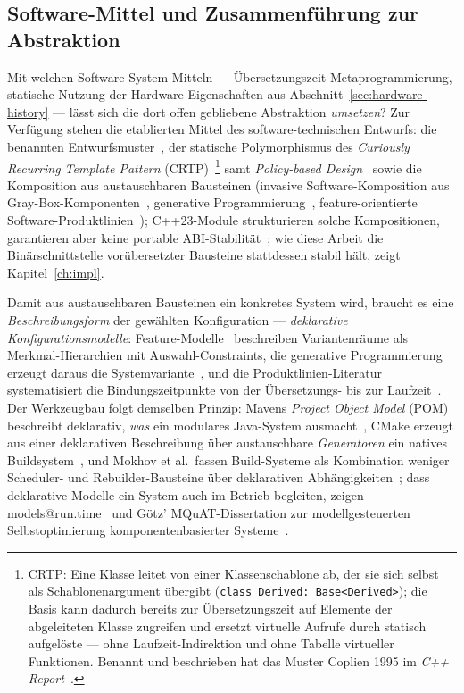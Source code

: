 \begin{nurkurz}
\section{Software-Mittel und Zusammenführung zur Abstraktion}\label{sec:software-means}
Mit welchen Software-System-Mitteln --- Übersetzungszeit-Metaprogrammierung, statische Nutzung der
Hardware-Eigenschaften aus Abschnitt~\ref{sec:hardware-history} --- lässt sich die dort offen gebliebene
Abstraktion \emph{umsetzen}? Zur
Verfügung stehen die etablierten Mittel des software-technischen Entwurfs: die benannten
Entwurfsmuster~\cite{gamma1994patterns}, der statische Polymorphismus des \emph{Curiously Recurring
Template Pattern} (CRTP)~\cite{coplien1995crtp,vandevoorde2017templates}\footnote{CRTP\@: Eine Klasse
leitet von einer Klassenschablone ab, der sie sich selbst als Schablonenargument übergibt
(\texttt{class Derived: Base<Derived>}); die Basis kann dadurch bereits zur Übersetzungszeit auf Elemente der
abgeleiteten Klasse zugreifen und ersetzt virtuelle Aufrufe durch statisch aufgelöste --- ohne
Laufzeit-Indirektion und ohne Tabelle virtueller Funktionen. Benannt und beschrieben hat das Muster
Coplien 1995 im \emph{C++ Report}~\cite{coplien1995crtp}.} samt \emph{Policy-based
Design}~\cite{alexandrescu2001modern} sowie die Komposition aus
austauschbaren Bausteinen (invasive Software-Komposition aus Gray-Box-Komponenten~\cite{assmann2003invasive},
generative Programmierung~\cite{czarnecki2000generative}, feature-orientierte
Software-Produktlinien~\cite{apel2013feature,batory1992hierarchical}); C++23-Module strukturieren solche
Kompositionen, garantieren aber keine portable ABI-Stabilität~\cite{wg21_modules_abi}; wie diese Arbeit die
Binärschnittstelle vorübersetzter Bausteine stattdessen stabil hält, zeigt Kapitel~\ref{ch:impl}.

Damit aus austauschbaren Bausteinen ein konkretes System wird, braucht es eine \emph{Beschreibungsform} der
gewählten Konfiguration --- \emph{deklarative Konfigurationsmodelle}: Feature-Modelle~\cite{kang1990foda}
beschreiben Variantenräume als Merkmal-Hierarchien mit Auswahl-Constraints, die generative Programmierung erzeugt
daraus die Systemvariante~\cite{czarnecki2000generative}, und die Produktlinien-Literatur systematisiert die
Bindungszeitpunkte von der Übersetzungs- bis zur Laufzeit~\cite{apel2013feature}. Der Werkzeugbau folgt demselben
Prinzip: Mavens \emph{Project Object Model} (POM) beschreibt deklarativ, \emph{was} ein modulares Java-System
ausmacht~\cite{maven_pom}, CMake erzeugt aus einer deklarativen Beschreibung über austauschbare \emph{Generatoren}
ein natives Buildsystem~\cite{cmake_manual}, und Mokhov et al.\ fassen Build-Systeme als Kombination weniger
Scheduler- und Rebuilder-Bausteine über deklarativen Abhängigkeiten~\cite{mokhov2018build}; dass deklarative Modelle
ein System auch im Betrieb begleiten, zeigen models@run.time~\cite{blair2009modelsruntime} und Götz'
MQuAT-Dissertation zur modellgesteuerten Selbstoptimierung komponentenbasierter Systeme~\cite{goetz2013mqat}.


\end{nurkurz}
